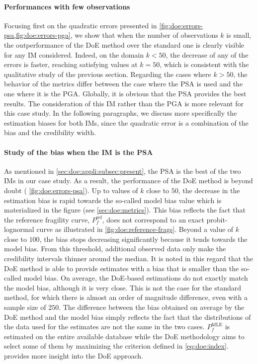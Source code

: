 \paragraph{Performances with few observations} {Focusing first on the quadratic errors presented in \cref{fig:doe:errors-psa,fig:doe:errors-pga}, we show that when the number of observations $k$ is small, the outperformance of the DoE method over the standard one is clearly visible for any IM considered.}
Indeed, on the domain $k<50$, the decrease of any of the errors is faster, reaching satisfying values at $k=50$, which is consistent with the qualitative study of the previous section.
Regarding the cases where $k>50$, the behavior of the metrics differ between the case where the PSA is used and the one where it is the PGA. Globally, it is obvious that the PSA provides the best results. The consideration of this IM rather than the PGA is more relevant for this case study. {In the following paragraphs, we discuss more specifically the estimation biases for both IMs, since the quadratic error is a combination of the bias and the credibility width.}

\paragraph{Study of the bias when the IM is the PSA}
As mentioned in \cref{sec:doe:appli:subsec:present}, the PSA is the best of the two IMs in our case study. As a result, the performance of the DoE method is beyond doubt ( \cref{fig:doe:errors-psa}). Up to values of $k$ close to $50$, the decrease in the estimation bias is rapid towards the so-called model bias value which is materialized in the figure (see \cref{sec:doe:metrics}). This bias reflects the fact that the reference fragility curve, $P_f^{\text{ref}}$, does not correspond to an exact probit-lognormal curve as illustrated in  \cref{fig:doe:reference-frags}. Beyond a value of $k$ close to $100$, the bias stops decreasing significantly because it tends towards the model bias. From this threshold, additional observed data only make the credibility intervals thinner around the median. It is noted in this regard that the DoE method is able to provide estimates with a bias that is smaller than the so-called model bias. On average, the DoE-based estimations do not exactly match the model bias, although it is very close. This is not the case for the standard method, for which there is almost an order of magnitude difference, even with a sample size of $250$. The difference between the bias obtained on average by the DoE method and the model bias simply reflects the fact that the distributions of the data used for the estimates are not the same in the two cases. $P_f^{\text{MLE}}$ is estimated on the entire available database while the DoE methodology aims to select some of them by maximizing the criterion defined in \cref{eq:doe:index}.  provides more insight into the DoE approach.


